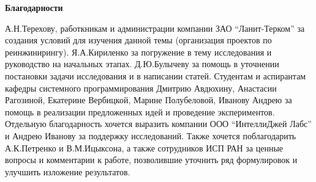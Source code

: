 \textbf{Благодарности}

А.Н.Терехову, работкникам и администрации компании ЗАО ``Ланит-Терком'' за создания условий для изучения данной темы (организация проектов по реинжинирингу). Я.А.Кириленко за погружение в тему исследования и руководство на начальных этапах. Д.Ю.Булычеву за помощь в уточнении постановки задачи исследования и в написании статей. Студентам и аспирантам кафедры системного программирования Дмитрию Авдюхину, Анастасии Рагозиной, Екатерине Вербицкой, Марине Полубеловой, Иванову Андрею за помощь в реализации предложенных идей и проведение экспериментов. Отдельную благодарность  хочется выразить компании ООО ``ИнтеллиДжей Лабс'' и Андрею Иванову за поддержку исследований. Также хочется поблагодарить А.К.Петренко и В.М.Ицыксона, а также сотрудников ИСП РАН за ценные вопросы и комментарии к работе, позволившие уточнить ряд формулировок и улучшить изложение результатов. 
